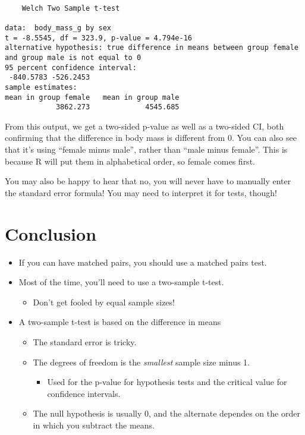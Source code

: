 \documentclass[
  letterpaper,
  DIV=11,
  numbers=noendperiod]{scrreprt}
\providecommand{\tightlist}{%
  \setlength{\itemsep}{0pt}\setlength{\parskip}{0pt}}\usepackage{longtable,booktabs,array}
\begin{document}
\begin{verbatim}

    Welch Two Sample t-test

data:  body_mass_g by sex
t = -8.5545, df = 323.9, p-value = 4.794e-16
alternative hypothesis: true difference in means between group female and group male is not equal to 0
95 percent confidence interval:
 -840.5783 -526.2453
sample estimates:
mean in group female   mean in group male 
            3862.273             4545.685 
\end{verbatim}

From this output, we get a two-sided p-value as well as a two-sided CI,
both confirming that the difference in body mass is different from 0.
You can also see that it's using ``female minus male'', rather than
``male minus female''. This is because R will put them in alphabetical
order, so female comes first.

You may also be happy to hear that no, you will never have to manually
enter the standard error formula! You may need to interpret it for
tests, though!

\hypertarget{conclusion-1}{%
\section{Conclusion}\label{conclusion-1}}

\begin{itemize}
\tightlist
\item
  If you can have matched pairs, you should use a matched pairs test.
\item
  Most of the time, you'll need to use a two-sample t-test.

  \begin{itemize}
  \tightlist
  \item
    Don't get fooled by equal sample sizes!
  \end{itemize}
\item
  A two-sample t-test is based on the difference in means

  \begin{itemize}
  \tightlist
  \item
    The standard error is tricky.
  \item
    The degrees of freedom is the \emph{smallest} sample size minus 1.

    \begin{itemize}
    \tightlist
    \item
      Used for the p-value for hypothesis tests and the critical value
      for confidence intervals.
    \end{itemize}
  \item
    The null hypothesis is usually 0, and the alternate dependes on the
    order in which you subtract the means.
  \end{itemize}
\end{itemize}
\end{document}
